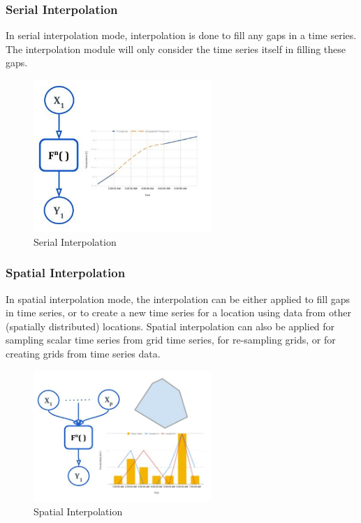 \subsubsection{Serial Interpolation}
In serial interpolation mode, interpolation is done to fill any gaps in a time series. The interpolation module will only consider the time series itself in filling these gaps.
\begin{figure}[htp]
    \centering
    \includegraphics[width=0.6\textwidth]{method/data_preprocess/serial_interpolation.jpg}
    \caption{Serial Interpolation}
    \label{fig:serial_interpolation}
\end{figure}

\subsubsection{Spatial Interpolation}
In spatial interpolation mode, the interpolation can be either applied to fill gaps in time series, or to create a new time series for a location using data from other (spatially distributed) locations. Spatial interpolation can also be applied for sampling scalar time series from grid time series, for re-sampling grids, or for creating grids from time series data.
\begin{figure}[htp]
    \centering
    \includegraphics[width=0.6\textwidth]{method/data_preprocess/spatial_interpolation.jpg}
    \caption{Spatial Interpolation}
    \label{fig:spatial_interpolation}
\end{figure}

